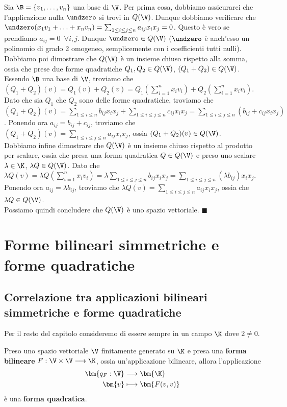 \documentclass[11pt, a4paper, titlepage, oneside]{scrbook}
\begin{document}
Sia $\B = \{v_1, \ldots, v_n\}$ una base di $\V$. Per prima cosa, dobbiamo assicurarci che l'applicazione nulla $\undzero$ si trovi in $Q(\V)$. Dunque dobbiamo verificare che \mbox{$\undzero(x_1 v_1 + \ldots + x_n v_n) = \sum_{1 \leq i \leq j \leq n} a_{ij} x_i x_j = 0$}. Questo è vero se prendiamo $a_{ij} = 0 \enspace \forall i,j$. Dunque $\undzero \in Q(\V)$ ($\undzero$ è anch'esso un polinomio di grado 2 omogeneo, semplicemente con i coefficienti tutti nulli). \\
Dobbiamo poi dimostrare che $Q(\V)$ è un insieme chiuso rispetto alla somma, ossia che prese due forme quadratiche $Q_1, Q_2 \in Q(\V)$, $(Q_1 + Q_2) \in Q(\V)$. Essendo $\B$ una base di $\V$, troviamo che \mbox{$(Q_1 + Q_2)(v) = Q_1(v) + Q_2(v) = Q_1(\sum_{i = 1}^n x_i v_i) + Q_2(\sum_{i = 1}^n x_i v_i)$}. Dato che sia $Q_1$ che $Q_2$ sono delle forme quadratiche, troviamo che \mbox{$(Q_1 + Q_2)(v) = \sum_{1 \leq i \leq n} b_{ij} x_i x_j + \sum_{1 \leq i \leq j  \leq n} c_{ij}x_i x_j = \sum_{1 \leq i \leq j \leq n} (b_{ij} + c_{ij} x_i x_j)$}. Ponendo ora $a_{ij} = b_{ij} + c_{ij}$, troviamo che $(Q_1 + Q_2)(v) = \sum_{1 \leq i \leq j \leq n} a_{ij} x_i x_j$, ossia $(Q_1 + Q_2)(v) \in Q(\V)$. \\
Dobbiamo infine dimostrare che $Q(\V)$ è un insieme chiuso rispetto al prodotto per scalare, ossia che presa una forma quadratica $Q \in Q(\V)$ e preso uno scalare $\lambda \in \K$, $\lambda Q \in Q(\V)$. Dato che \mbox{$\lambda Q(v) = \lambda Q(\sum_{i = 1}^n x_i v_i) = \lambda \sum_{1 \leq i \leq j \leq n} b_{ij} x_i x_j = \sum_{1 \leq i \leq j \leq n} (\lambda b_{ij}) x_i x_j$}. Ponendo ora $a_{ij} = \lambda b_{ij}$, troviamo che $\lambda Q(v) = \sum_{1 \leq i \leq j \leq n} a_{ij} x_i x_j$, ossia che $\lambda Q \in Q(\V)$.\\
Possiamo quindi concludere che $Q(\V)$ è uno spazio vettoriale. $\blacksquare$

\section{Forme bilineari simmetriche e forme quadratiche}
\subsection{Correlazione tra applicazioni bilineari simmetriche e forme quadratiche}
\NB Per il resto del capitolo consideremo di essere sempre in un campo $\K$ dove $2 \neq 0$.

\begin{Osservazione}[]
\label{oss-forma-bilineare-quadratica}
Preso uno spazio vettoriale $\V$ finitamente generato su $\K$ e presa una \textbf{forma bilineare} $F: \V \times \V \longrightarrow \K$, ossia un'applicazione bilineare, allora l'applicazione
\begin{align*}
\bm{q_F: \V} &\longrightarrow \bm{\K} \\
\bm{v} &\longmapsto \bm{F(v,v)}
\end{align*}
è una \textbf{forma quadratica}.
\end{Osservazione}
\end{document}
